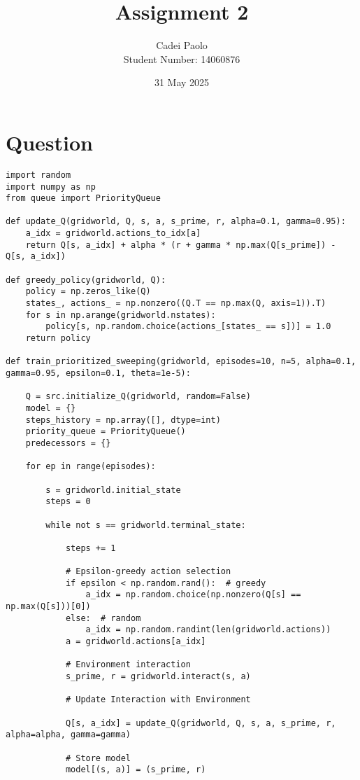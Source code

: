 \documentclass[12pt]{article}
\title{Assignment 2}
\author{Cadei Paolo \\ Student Number: 14060876}
\date{31 May 2025}
\begin{document}
\maketitle

\section{Question}

\begin{lstlisting}
import random
import numpy as np
from queue import PriorityQueue

def update_Q(gridworld, Q, s, a, s_prime, r, alpha=0.1, gamma=0.95):
    a_idx = gridworld.actions_to_idx[a]
    return Q[s, a_idx] + alpha * (r + gamma * np.max(Q[s_prime]) - Q[s, a_idx])

def greedy_policy(gridworld, Q):
    policy = np.zeros_like(Q)
    states_, actions_ = np.nonzero((Q.T == np.max(Q, axis=1)).T)
    for s in np.arange(gridworld.nstates):
        policy[s, np.random.choice(actions_[states_ == s])] = 1.0
    return policy

def train_prioritized_sweeping(gridworld, episodes=10, n=5, alpha=0.1, gamma=0.95, epsilon=0.1, theta=1e-5):

    Q = src.initialize_Q(gridworld, random=False)
    model = {}
    steps_history = np.array([], dtype=int)
    priority_queue = PriorityQueue()
    predecessors = {}
    
    for ep in range(episodes):

        s = gridworld.initial_state
        steps = 0

        while not s == gridworld.terminal_state:

            steps += 1

            # Epsilon-greedy action selection
            if epsilon < np.random.rand():  # greedy
                a_idx = np.random.choice(np.nonzero(Q[s] == np.max(Q[s]))[0])
            else:  # random
                a_idx = np.random.randint(len(gridworld.actions))
            a = gridworld.actions[a_idx]

            # Environment interaction
            s_prime, r = gridworld.interact(s, a)

            # Update Interaction with Environment

            Q[s, a_idx] = update_Q(gridworld, Q, s, a, s_prime, r,  alpha=alpha, gamma=gamma)

            # Store model
            model[(s, a)] = (s_prime, r)


\end{lstlisting}
\end{document}

